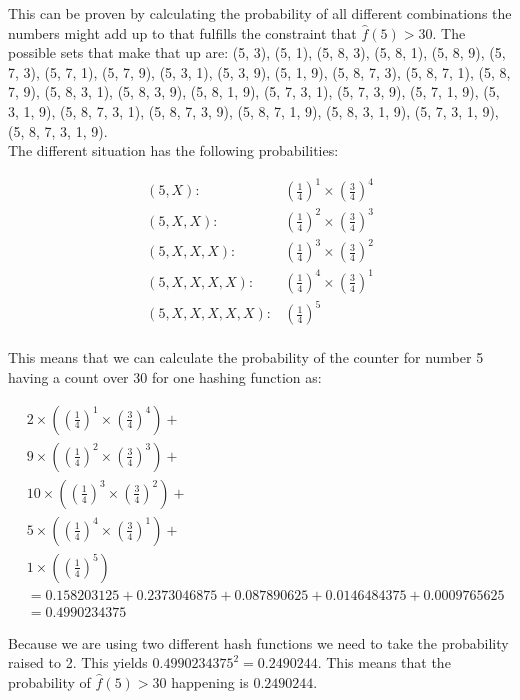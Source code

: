 \documentclass{article}
\begin{document}
\noindent This can be proven by calculating the probability of all different combinations the numbers might add up to that fulfills the constraint that  \(\hat{f}(5) > 30\). The possible sets that make that up are: (5, 3), (5, 1), (5, 8, 3), (5, 8, 1), (5, 8, 9), (5, 7, 3), (5, 7, 1), (5, 7, 9), (5, 3, 1), (5, 3, 9), (5, 1, 9), (5, 8, 7, 3), (5, 8, 7, 1), (5, 8, 7, 9), (5, 8, 3, 1), (5, 8, 3, 9), (5, 8, 1, 9), (5, 7, 3, 1), (5, 7, 3, 9), (5, 7, 1, 9), (5, 3, 1, 9), (5, 8, 7, 3, 1), (5, 8, 7, 3, 9), (5, 8, 7, 1, 9), (5, 8, 3, 1, 9), (5, 7, 3, 1, 9), (5, 8, 7, 3, 1, 9).\\ 

\noindent The different situation has the following probabilities:

\begin{align*}
(5, X):& \left(\frac{1}{4}\right)^1 \times \left(\frac{3}{4}\right)^4  \\
(5, X, X):& \left(\frac{1}{4}\right)^2 \times \left(\frac{3}{4}\right)^3 \\
(5, X, X, X):& \left(\frac{1}{4}\right)^3 \times \left(\frac{3}{4}\right)^2 \\
(5, X, X, X, X):& \left(\frac{1}{4}\right)^4 \times \left(\frac{3}{4}\right)^1 \\
(5, X, X, X, X, X):& \left(\frac{1}{4}\right)^5 \\
\end{align*}

\noindent This means that we can calculate the probability of the counter for number 5 having a count over 30 for one hashing function as:

\begin{align*}
&2 \times \left(\left(\frac{1}{4}\right)^1 \times \left(\frac{3}{4}\right)^4\right) + \\
&9 \times \left(\left(\frac{1}{4}\right)^2 \times \left(\frac{3}{4}\right)^3\right) + \\
&10 \times \left(\left(\frac{1}{4}\right)^3 \times \left(\frac{3}{4}\right)^2\right) + \\
&5 \times \left(\left(\frac{1}{4}\right)^4 \times \left(\frac{3}{4}\right)^1\right) + \\
&1 \times \left(\left(\frac{1}{4}\right)^5\right) \\
&= 0.158203125 + 0.2373046875 + 0.087890625 + 0.0146484375 + 0.0009765625  \\
&= 0.4990234375
\end{align*}


\noindent Because we are using two different hash functions we need to take the probability raised to 2. This yields \(0.4990234375^2 = 0.2490244\). This means that the probability of \(\hat{f}(5) > 30\) happening is \(0.2490244\). \\
\end{document}
